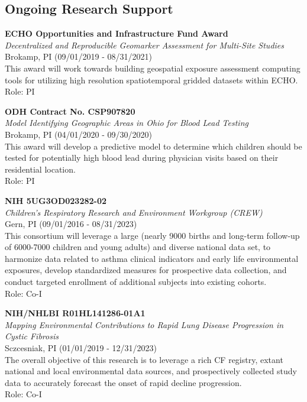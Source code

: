 \documentclass{nihbiosketch}
\begin{document}
\subsection*{Ongoing Research Support}

\bigskip

\textbf{ECHO Opportunities and Infrastructure Fund Award}\\
\emph{Decentralized and Reproducible Geomarker Assessment for Multi-Site
  Studies}\\
Brokamp, PI (09/01/2019 - 08/31/2021)\\
This award will work towards building geospatial exposure assessment
computing tools for utilizing high resolution spatiotemporal gridded
datasets within ECHO.\\
Role: PI

\bigskip


\textbf{ODH Contract No. CSP907820}\\
\emph{Model Identifying Geographic Areas in Ohio for Blood Lead Testing}\\
Brokamp, PI (04/01/2020 - 09/30/2020)\\
This award will develop a predictive model to determine which children should be
tested for potentially high blood lead during physician visits based on their
residential location. \\
Role: PI

\bigskip

\textbf{NIH 5UG3OD023282-02}\\
\emph{Children's Respiratory Research and Environment Workgroup
(CREW)}\\
Gern, PI (09/01/2016 - 08/31/2023)\\
This consortium will leverage a large (nearly 9000 births and
long-term follow-up of 6000-7000 children and young adults) and diverse
national data set, to harmonize data related to asthma clinical
indicators and early life environmental exposures, develop
standardized measures for prospective data collection, and conduct targeted enrollment of
additional subjects into existing cohorts.\\
Role: Co-I

\bigskip

\textbf{NIH/NHLBI R01HL141286-01A1}\\
\emph{Mapping Environmental Contributions to Rapid Lung Disease
Progression in Cystic Fibrosis}\\
Sczcesniak, PI (01/01/2019 - 12/31/2023)\\
The overall objective of this research is to leverage a rich CF
registry, extant national and local environmental data sources, and
prospectively collected study data to accurately forecast the onset of
rapid decline progression.\\
Role: Co-I
\end{document}
